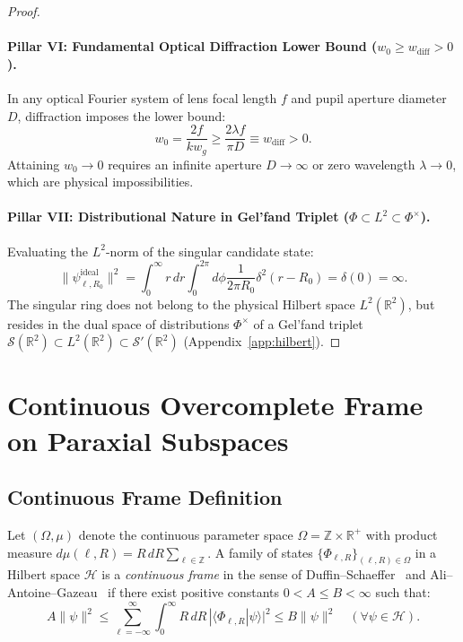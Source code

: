 \documentclass{optica-article}
\begin{document}
\begin{proof}
\paragraph{Pillar VI: Fundamental Optical Diffraction Lower Bound ($w_0 \ge w_{\text{diff}} > 0$).}
In any optical Fourier system of lens focal length $f$ and pupil aperture diameter $D$, diffraction imposes the lower bound:
\begin{equation}
\boxed{w_0 = \frac{2 f}{k w_g} \ge \frac{2 \lambda f}{\pi D} \equiv w_{\text{diff}} > 0.}
\label{eq:pillar6_result}
\end{equation}
Attaining $w_0 \to 0$ requires an infinite aperture $D \to \infty$ or zero wavelength $\lambda \to 0$, which are physical impossibilities.

\paragraph{Pillar VII: Distributional Nature in Gel'fand Triplet ($\Phi \subset L^2 \subset \Phi^\times$).}
Evaluating the $L^2$-norm of the singular candidate state:
\begin{equation}
\boxed{\|\psi_{\ell, R_0}^{\text{ideal}}\|^2 = \int_0^\infty r \, dr \int_0^{2\pi} d\phi \frac{1}{2\pi R_0} \delta^2(r - R_0) = \delta(0) = \infty.}
\label{eq:pillar7_result}
\end{equation}
The singular ring does not belong to the physical Hilbert space $L^2(\mathbb{R}^2)$, but resides in the dual space of distributions $\Phi^\times$ of a Gel'fand triplet $\mathcal{S}(\mathbb{R}^2) \subset L^2(\mathbb{R}^2) \subset \mathcal{S}'(\mathbb{R}^2)$ (Appendix~\ref{app:hilbert}).
\end{proof}

\section{Continuous Overcomplete Frame on Paraxial Subspaces}
\label{sec:frame_theory}

\subsection{Continuous Frame Definition}

Let $(\Omega, \mu)$ denote the continuous parameter space $\Omega = \mathbb{Z} \times \mathbb{R}^+$ with product measure $d\mu(\ell, R) = R \, dR \sum_{\ell \in \mathbb{Z}}$. A family of states $\{\Phi_{\ell, R}\}_{(\ell, R) \in \Omega}$ in a Hilbert space $\mathcal{H}$ is a \emph{continuous frame} in the sense of Duffin--Schaeffer~\cite{Duffin1952} and Ali--Antoine--Gazeau~\cite{Ali1993,Daubechies1990,Christensen2016} if there exist positive constants $0 < A \le B < \infty$ such that:
\begin{equation}
A \|\psi\|^2 \le \sum_{\ell=-\infty}^\infty \int_0^\infty R \, dR \, |\langle \Phi_{\ell, R} | \psi \rangle|^2 \le B \|\psi\|^2 \quad (\forall \psi \in \mathcal{H}).
\label{eq:frame_def}
\end{equation}
\end{document}
